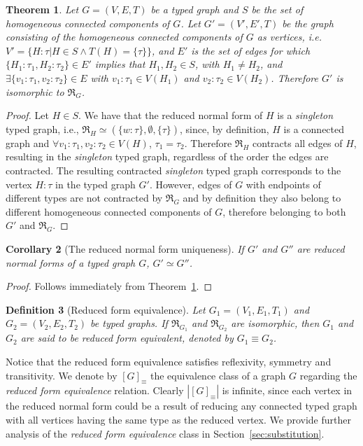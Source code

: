 \documentclass[preprint,12pt]{elsarticle}
\theoremstyle{plain}
\newtheorem{theorem}{Theorem}[section]
\newtheorem{corollary}[theorem]{Corollary}
\newtheorem{definition}[theorem]{Definition}
\newcommand\tyv[2]{#1\!\!:\!\!#2}
\begin{document}
\begin{theorem}\label{theorem:ETCCequiv}
Let $G = (V,E,T)$ be a typed graph
and $S$ be the set of homogeneous connected components of $G$.
Let $G' = (V',E',T)$ be the graph consisting of the homogeneous connected components of $G$ as vertices, i.e.
$V' = \{\tyv{H}{\tau}|H\in S \wedge T(H) = \{\tau\} \}$, and
$E'$ is the set of edges for which $\{\tyv{H_1}{\tau_1},\tyv{H_2}{\tau_2}\}\in E'$
implies that $H_1,H_2\in S$, with $H_1\neq H_2$, and $\exists \{\tyv{v_1}{\tau_1}, \tyv{v_2}{\tau_2}\}\in E$
with $\tyv{v_1}{\tau_1}\in V(H_1)$ and $\tyv{v_2}{\tau_2}\in V(H_2)$.
Therefore $G'$ is isomorphic to $\Re_G$.
\end{theorem}
\begin{proof}
Let $H\in S$. We have that the reduced normal form of $H$ is a \textit{singleton} typed graph,
i.e., $\Re_H \simeq (\{\tyv{w}{\tau}\}, \emptyset, \{\tau\})$,
since, by definition, $H$ is a connected graph and
$\forall \tyv{v_1}{\tau_1}, \tyv{v_2}{\tau_2} \in V(H)$, $\tau_1=\tau_2$.
Therefore $\Re_H$ contracts all edges of $H$, resulting in the \textit{singleton} typed graph,
regardless of the order the edges are contracted.
The resulting contracted \textit{singleton} typed graph corresponds to the
vertex $\tyv{H}{\tau}$ in the typed graph $G'$.
However, edges of $G$ with endpoints of different types are not contracted by $\Re_G$
and by definition they also belong to different homogeneous connected components
of $G$, therefore belonging to both $G'$ and $\Re_G$.
\end{proof}

\begin{corollary}[The reduced normal form uniqueness]\label{cor:uniquereducedgraph}
If $G'$ and $G''$ are reduced normal forms of a typed graph $G$,
$G' \simeq G''$.
\end{corollary}
\begin{proof}
Follows immediately from Theorem~\ref{theorem:ETCCequiv}.
\end{proof}

\begin{definition}[Reduced form equivalence]
Let $G_1 = (V_1,E_1,T_1)$ and $G_2 = (V_2,E_2,T_2)$ be typed graphs.
If $\Re_{G_1}$ and $\Re_{G_2}$ are isomorphic, then $G_1$ and $G_2$ are said to
be \textit{reduced form equivalent}, denoted by $G_1 \equiv G_2$.
\end{definition}

Notice that the reduced form equivalence satisfies reflexivity, symmetry and transitivity.
We denote by $[G]_\equiv$ the equivalence class
of a graph $G$ regarding the \textit{reduced form equivalence} relation.
Clearly $|[G]_\equiv|$ is infinite, since each vertex in the reduced normal form
could be a result of reducing any connected typed graph with all vertices having the same
type as the reduced vertex.
We provide further analysis of the \textit{reduced form equivalence} class
in Section~\ref{sec:substitution}.
\end{document}
